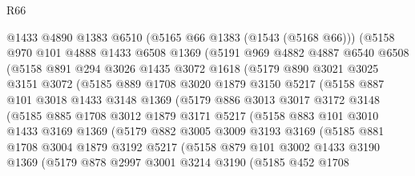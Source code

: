 \begin{lexlean}{R66}
\begin{coremodule}
        @1433
        @4890
        @1383
        @6510
        (@5165 @66 @1383 (@1543 (@5168 @66)))
        (@5158
          @970
          @101
          @4888
          @1433
          @6508
          @1369
          (@5191
            @969
            @4882
            @4887
            @6540
            @6508
            (@5158
              @891
              @294
              @3026
              @1435
              @3072
              @1618
              (@5179
                @890
                @3021
                @3025
                @3151
                @3072
                (@5185
                  @889
                  @1708
                  @3020
                  @1879
                  @3150
                  @5217
                  (@5158
                    @887
                    @101
                    @3018
                    @1433
                    @3148
                    @1369
                    (@5179
                      @886
                      @3013
                      @3017
                      @3172
                      @3148
                      (@5185
                        @885
                        @1708
                        @3012
                        @1879
                        @3171
                        @5217
                        (@5158
                          @883
                          @101
                          @3010
                          @1433
                          @3169
                          @1369
                          (@5179
                            @882
                            @3005
                            @3009
                            @3193
                            @3169
                            (@5185
                              @881
                              @1708
                              @3004
                              @1879
                              @3192
                              @5217
                              (@5158
                                @879
                                @101
                                @3002
                                @1433
                                @3190
                                @1369
                                (@5179
                                  @878
                                  @2997
                                  @3001
                                  @3214
                                  @3190
                                  (@5185
                                    @452
                                    @1708

\end{coremodule}
\end{lexlean}
